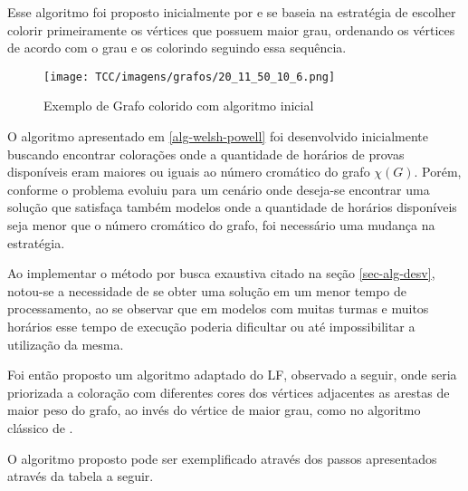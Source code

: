 Esse algoritmo foi proposto inicialmente por  e se baseia na estratégia de escolher colorir primeiramente os vértices que possuem maior grau, ordenando os vértices de acordo com o grau e os colorindo seguindo essa sequência.


\begin{figure}[H]
     \centering
     \texttt{[image: TCC/imagens/grafos/20\_11\_50\_10\_6.png]}
     \caption{Exemplo de Grafo colorido com algoritmo inicial }
     \label{grafo-20_11_50_10_6}
\end{figure}


\noindent\begin{minipage}{\linewidth}
\lstset{numbers=left, numberstyle=\tiny, stepnumber=1, numbersep=15pt}


\end{minipage}

O algoritmo apresentado em \ref{alg-welsh-powell} foi desenvolvido inicialmente buscando encontrar colorações onde a quantidade de horários de provas disponíveis eram maiores ou iguais ao número cromático do grafo $\chi(G)$. Porém, conforme o problema evoluiu para um cenário onde deseja-se encontrar uma solução que satisfaça também modelos onde a quantidade de horários disponíveis seja menor que o número cromático do grafo, foi necessário uma mudança na estratégia.

Ao implementar o método por busca exaustiva citado na seção \ref{sec-alg-desv},  notou-se a necessidade de se obter uma solução em um menor tempo de processamento, ao se observar que em modelos com muitas turmas e muitos horários esse tempo de execução poderia dificultar ou até impossibilitar a utilização da mesma.

Foi então proposto um algoritmo adaptado do LF, observado a seguir, onde seria priorizada a coloração com diferentes cores dos vértices adjacentes as arestas de maior peso do grafo, ao invés do vértice de maior grau, como no algoritmo clássico de .

O algoritmo proposto pode ser exemplificado através dos passos apresentados através da tabela a seguir.


